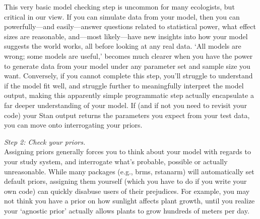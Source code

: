\documentclass[11pt]{article}
\begin{document}
{This very basic model checking step is uncommon for many ecologists, but critical in our view. If you can simulate data from your model, then you can powerfully---and easily---answer questions related to statistical power, what effect sizes are reasonable, and---most likely---have new insights into how your model suggests the world works, all before looking at any real data. `All models are wrong; some models are useful,' becomes much clearer when you have the power to generate data from your model under any parameter set and sample size you want. Conversely, if you cannot complete this step, you'll struggle to understand if the model fit well, and struggle further to meaningfully interpret the model output, making this apparently simple programmatic step actually encapsulate a far deeper understanding of your model. If (and if not you need to revisit your code) your \textsf{Stan} output returns the parameters you expect from your test data, you can move onto interrogating your priors. 

\emph{Step 2: Check your priors.} \\


Assigning priors generally forces you to think about your model with regards to your study system, and interrogate what's probable, possible or actually unreasonable. While many packages (e.g., \textsf{brms, rstanarm}) will automatically set default priors, assigning them yourself (which you have to do if you write your own code) can quickly disabuse users of their prejudices. For example, you may not think you have a prior on how sunlight affects plant growth, until you realize your `agnostic prior' actually allows plants to grow hundreds of meters per day. %

}
\end{document}
